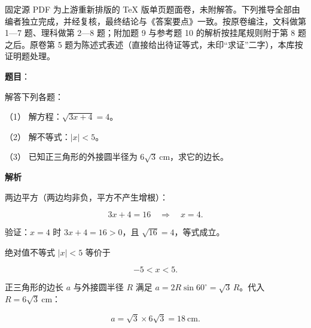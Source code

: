

\begin{gktip}
固定源 PDF 为上游重新排版的 TeX 版单页题面卷，未附解答。下列推导全部由编者独立完成，并经复核，最终结论与《答案要点》一致。按原卷编注，文科做第 1—7 题、理科做第 2—8 题；附加题 9 与参考题 10 的解析按挂尾规则附于第 8 题之后。原卷第 5 题为陈述式表述（直接给出待证等式，未印“求证”二字），本库按证明题处理。
\end{gktip}

\begin{answer}

\textbf{题目}：

解答下列各题：

（1） 解方程：$\sqrt{3x+4}=4$。

（2） 解不等式：$|x|<5$。

（3） 已知正三角形的外接圆半径为 $6\sqrt3\ \mathrm{cm}$，求它的边长。

\textbf{解析}


两边平方（两边均非负，平方不产生增根）：

\nopagebreak[4]
\[
3x+4=16
\quad\Longrightarrow\quad
x=4.
\]

验证：$x=4$ 时 $3x+4=16>0$，且 $\sqrt{16}=4$，等式成立。


绝对值不等式 $|x|<5$ 等价于

\nopagebreak[4]
\[
-5<x<5.
\]


正三角形的边长 $a$ 与外接圆半径 $R$ 满足 $a=2R\sin60^\circ=\sqrt3\,R$。代入 $R=6\sqrt3\ \mathrm{cm}$：

\nopagebreak[4]
\[
a=\sqrt3\times6\sqrt3=18\ \mathrm{cm}.
\]




\end{answer}
